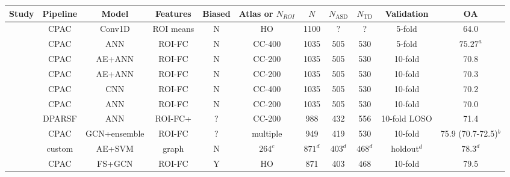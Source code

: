 \documentclass[10pt]{article}
\begin{document}
\newpage
\begin{landscape}

\begin{table}
  \small
  \centering
  \begin{tabular}{lcccccccccc}
    \toprule
    Study                                                         & Pipeline & Model  & Features & Biased &Atlas or \(N_{ROI}\)  & \(N\) & \(N_\text{ASD}\) & \(N_{\text{TD}}\) & Validation & OA \\
    \midrule
    \citeauthor{el-gazzarHybrid3DCNN3DCLSTM2019}                       &   CPAC   & Conv1D & ROI means&   N    &     HO     & 1100  &   ?   &   ?   &   5-fold   &       64.0       \\
    \citeauthor{yangDeepNeuralNetwork2020}                             &   CPAC   &  ANN   &  ROI-FC  &   N    &   CC-400   & 1035  &  505  &  530  &   5-fold   &     \(75.27^a\)  \\
    \citeauthor{almuqhimASDSAENetSparseAutoencoder2021}                &   CPAC   & AE+ANN &  ROI-FC  &   N    &   CC-200   & 1035  &  505  &  530  &  10-fold   &       70.8       \\
    \citeauthor{eslamiASDDiagNetHybridLearning2019}                    &   CPAC   & AE+ANN &  ROI-FC  &   N    &   CC-200   & 1035  &  505  &  530  &  10-fold   &       70.3       \\
    \citeauthor{sherkatghanadAutomatedDetectionAutism2020}             &   CPAC   &  CNN   &  ROI-FC  &   N    &   CC-400   & 1035  &  505  &  530  &  10-fold   &       70.2       \\
    \citeauthor{heinsfeldIdentificationAutismSpectrum2018}             &   CPAC   &   ANN  &  ROI-FC  &   N    &   CC-200   & 1035  &  505  &  530  &  10-fold   &       70.0       \\
    \citeauthor{ingalhalikarFunctionalConnectivitybasedPrediction2021} &  DPARSF  &  ANN   &  ROI-FC+ &   ?    &   CC-200   &  988  &  432  &  556  &10-fold LOSO&       71.4       \\
    \citeauthor{wangMAGEAutomaticDiagnosis2021}                        &   CPAC   &GCN+ensemble&ROI-FC&   ?    &  multiple  &  949  &  419  &  530  &  10-fold   & 75.9 (70.7-72.5)\(^b\)  \\
    \citeauthor{yinDiagnosisAutismSpectrum2021}                        &  custom  & AE+SVM &  graph   &   N    & \(264^c\)  & \(871^d\) & \(403^d\) & \(468^d\)  &  holdout\(^d\) & \(78.3^d\) \\
    \citeauthor{shaoClassificationASDBased2021}                        &   CPAC   & FS+GCN &  ROI-FC  &   Y    &     HO     &  871  &  403  &  468  &  10-fold   &       79.5       \\

\end{tabular}
\end{table}
\end{landscape}
\end{document}
